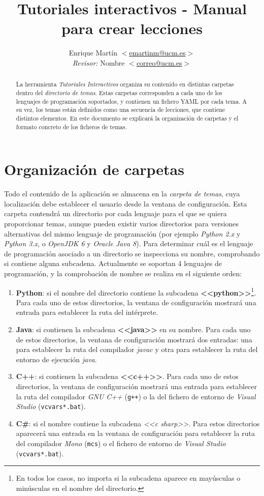 \documentclass[]{article}
\title{Tutoriales interactivos - Manual para crear lecciones}
\author{Enrique Martín $<$\url{emartinm@ucm.es}$>$ \\ \emph{Revisor:} Nombre $<$\url{correo@ucm.es}$>$\\}
\newcommand{\code}[1]{{\lstinline[basicstyle=\ttfamily,mathescape]!#1!}}
\newcommand{\toolname}{\emph{Tutoriales Interactivos}}
\begin{document}
\maketitle

\begin{abstract}
La herramienta \toolname{} organiza su contenido en distintas carpetas dentro del \emph{directorio de temas}. Estas carpetas corresponden a cada uno de los lenguajes de programación soportados, y contienen un fichero YAML por cada tema. A su vez, los temas están definidos como una secuencia de lecciones, que contiene distintos elementos. En este documento se explicará la organización de carpetas y el formato concreto de los ficheros de temas.
\end{abstract}


\section{Organización de carpetas}
Todo el contenido de la aplicación se almacena en la \emph{carpeta de temas}, cuya localización debe establecer el usuario desde la ventana de configuración. Esta carpeta contendrá un directorio por cada lenguaje para el que se quiera proporcionar temas, aunque pueden existir varios directorios para versiones alternativas del mismo lenguaje de programación (por ejemplo \emph{Python 2.x} y \emph{Python 3.x}, o \emph{OpenJDK 6} y \emph{Oracle Java 8}). Para determinar cuál es el lenguaje de programación asociado a un directorio se inspecciona su nombre, comprobando si contiene alguna subcadena. Actualmente se soportan 4 lenguajes de programación, y la comprobación de nombre se realiza en el siguiente orden:

\begin{enumerate}
  \item \textbf{Python}: si el nombre del directorio contiene la subcadena \textbf{<<python>>}\footnote{En todos los casos, no importa si la subcadena aparece en mayúsculas o minúsculas en el nombre del directorio.}. Para cada uno de estos directorios, la ventana de configuración mostrará una entrada para establecer la ruta del intérprete.
  \item \textbf{Java}: si contienen la subcadena \textbf{<<java>>} en su nombre. Para cada uno de estos directorios, la ventana de configuración mostrará dos entradas: una para establecer la ruta del compilador \emph{javac} y otra para establecer la ruta del entorno de ejecución \emph{java}.
  \item \textbf{C++}: si contienen la subcadena \textbf{<<c++>>}. Para cada uno de estos directorios, la ventana de configuración mostrará una entrada para establecer la ruta del compilador \emph{GNU C++} (\code{g++}) o la del fichero de entorno de \emph{Visual Studio} (\code{vcvars*.bat}). 
  \item \textbf{C\#}: si el nombre contiene la subcadena \emph{<<c sharp>>}. Para estos directorios aparecerá una entrada en la ventana de configuración para establecer la ruta del compilador \emph{Mono} (\code{mcs}) o el fichero de entorno de \emph{Visual Studio} (\code{vcvars*.bat}).
\end{enumerate}
\end{document}
